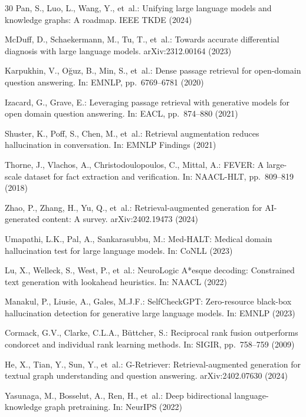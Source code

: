 \documentclass[runningheads]{llncs}
\begin{document}
\begin{thebibliography}{30}
Pan, S., Luo, L., Wang, Y., et~al.: Unifying large language models and knowledge graphs: A roadmap. IEEE TKDE (2024)

McDuff, D., Schaekermann, M., Tu, T., et~al.: Towards accurate differential diagnosis with large language models. arXiv:2312.00164 (2023)

Karpukhin, V., O\u{g}uz, B., Min, S., et~al.: Dense passage retrieval for open-domain question answering. In: EMNLP, pp.~6769--6781 (2020)

Izacard, G., Grave, E.: Leveraging passage retrieval with generative models for open domain question answering. In: EACL, pp.~874--880 (2021)

Shuster, K., Poff, S., Chen, M., et~al.: Retrieval augmentation reduces hallucination in conversation. In: EMNLP Findings (2021)

Thorne, J., Vlachos, A., Christodoulopoulos, C., Mittal, A.: FEVER: A large-scale dataset for fact extraction and verification. In: NAACL-HLT, pp.~809--819 (2018)

Zhao, P., Zhang, H., Yu, Q., et~al.: Retrieval-augmented generation for AI-generated content: A survey. arXiv:2402.19473 (2024)

Umapathi, L.K., Pal, A., Sankarasubbu, M.: Med-HALT: Medical domain hallucination test for large language models. In: CoNLL (2023)

Lu, X., Welleck, S., West, P., et~al.: NeuroLogic A*esque decoding: Constrained text generation with lookahead heuristics. In: NAACL (2022)

Manakul, P., Liusie, A., Gales, M.J.F.: SelfCheckGPT: Zero-resource black-box hallucination detection for generative large language models. In: EMNLP (2023)

Cormack, G.V., Clarke, C.L.A., B\"uttcher, S.: Reciprocal rank fusion outperforms condorcet and individual rank learning methods. In: SIGIR, pp.~758--759 (2009)

He, X., Tian, Y., Sun, Y., et~al.: G-Retriever: Retrieval-augmented generation for textual graph understanding and question answering. arXiv:2402.07630 (2024)

Yasunaga, M., Bosselut, A., Ren, H., et~al.: Deep bidirectional language-knowledge graph pretraining. In: NeurIPS (2022)


\end{thebibliography}
\end{document}
